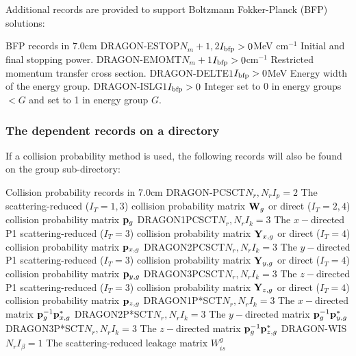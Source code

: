 Additional records are provided to support Boltzmann Fokker-Planck (BFP) solutions:

\begin{DescriptionEnregistrement}{BFP records in }{7.0cm}
\OptRealEnr
  {DRAGON-ESTOP}{$N_{m}+1,2$}{$I_{\rm bfp}>0$}{MeV cm$^{-1}$}
  {Initial and final stopping power.}
\OptRealEnr
  {DRAGON-EMOMT}{$N_{m}+1$}{$I_{\rm bfp}>0$}{cm$^{-1}$}
  {Restricted momentum transfer cross section. }
\OptRealEnr
  {DRAGON-DELTE}{$1$}{$I_{\rm bfp}>0$}{MeV}
  {Energy width of the energy group.}
\OptIntEnr
  {DRAGON-ISLG}{$1$}{$I_{\rm bfp}>0$}
  {Integer set to 0 in energy groups $< G$ and set to 1 in energy group $G$.}
\end{DescriptionEnregistrement}

\vskip -0.5cm

\subsubsection{The  dependent records on a  directory}\label{sect:traficgrpdiringdir}

If a collision probability method is used, the following records will also be
found on the group sub-directory:

\begin{DescriptionEnregistrement}{Collision probability records in }{7.0cm}
\OptRealEnr
  {DRAGON-PCSCT}{$N_{r},N_{r}$}{$I_{p}=2$}{} 
  {The scattering-reduced ($I_{T}=1,3$)  collision probability matrix ${\bf W}_{g}$ or direct
   ($I_{T}=2,4$) collision probability matrix ${\bf p}_{g}$}
\OptRealEnr
  {DRAGON1PCSCT}{$N_{r},N_{r}$}{$I_{k}=3$}{} 
{The $x-$directed P1 scattering-reduced ($I_{T}=3$) collision probability matrix ${\bf Y}_{x,g}$
   or direct ($I_{T}=4$) collision probability matrix ${\bf p}_{x,g}$}
\OptRealEnr
  {DRAGON2PCSCT}{$N_{r},N_{r}$}{$I_{k}=3$}{} 
  {The $y-$directed P1 scattering-reduced ($I_{T}=3$) collision probability matrix ${\bf Y}_{y,g}$
   or direct ($I_{T}=4$) collision probability matrix ${\bf p}_{y,g}$}
\OptRealEnr
  {DRAGON3PCSCT}{$N_{r},N_{r}$}{$I_{k}=3$}{} 
  {The $z-$directed P1 scattering-reduced ($I_{T}=3$) collision probability matrix ${\bf Y}_{z,g}$
   or direct ($I_{T}=4$) collision probability matrix ${\bf p}_{z,g}$}
\OptRealEnr
  {DRAGON1P*SCT}{$N_{r},N_{r}$}{$I_{k}=3$}{} 
  {The $x-$directed matrix ${\bf p}_g^{-1}{\bf p}_{x,g}^*$}
\OptRealEnr
  {DRAGON2P*SCT}{$N_{r},N_{r}$}{$I_{k}=3$}{} 
  {The $y-$directed matrix ${\bf p}_g^{-1}{\bf p}_{y,g}^*$}
\OptRealEnr
  {DRAGON3P*SCT}{$N_{r},N_{r}$}{$I_{k}=3$}{} 
  {The $z-$directed matrix ${\bf p}_g^{-1}{\bf p}_{z,g}^*$}
\OptRealEnr
  {DRAGON-WIS}{$N_{r}$}{$I_{\beta}=1$}{} 
  {The scattering-reduced leakage matrix $W_{is}^{g}$ }
\end{DescriptionEnregistrement}

